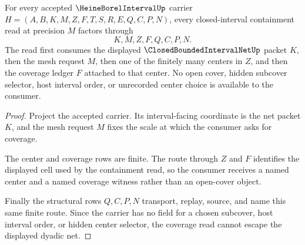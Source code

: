\begin{theorem}
\label{thm:heine-borel-interval-net-coverage}
For every accepted $\HeineBorelIntervalUp$ carrier $H=(A,B,K,M,Z,F,T,S,R,E,Q,C,P,N)$, every closed-interval containment read at precision $M$ factors through
$$
K,M,Z,F,Q,C,P,N.
$$
The read first consumes the displayed $\ClosedBoundedIntervalNetUp$ packet $K$, then the mesh request $M$, then one of the finitely many centers in $Z$, and then the coverage ledger $F$ attached to that center. No open cover, hidden subcover selector, host interval order, or unrecorded center choice is available to the consumer.
\end{theorem}
\begin{proof}
Project the accepted carrier. Its interval-facing coordinate is the net packet $K$, and the mesh request $M$ fixes the scale at which the consumer asks for coverage.

The center and coverage rows are finite. The route through $Z$ and $F$ identifies the displayed cell used by the containment read, so the consumer receives a named center and a named coverage witness rather than an open-cover object.

Finally the structural rows $Q,C,P,N$ transport, replay, source, and name this same finite route. Since the carrier has no field for a chosen subcover, host interval order, or hidden center selector, the coverage read cannot escape the displayed dyadic net.
\end{proof}

